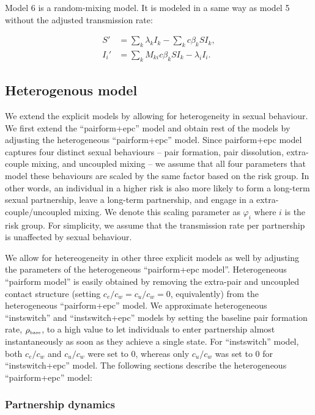\documentclass[10pt,letterpaper]{article}
\newcommand{\tsub}[2]{#1_{{\textrm{\tiny #2}}}}
\begin{document}
Model 6 is a random-mixing model. It is modeled in a same way as model 5 without the adjusted transmission rate:

\begin{equation}
\begin{aligned}
S' & = \sum_k \lambda_k I_k - \sum_k c \beta_k S I_k,\\
I_i' & = \sum_k M_{ki} c \beta_k S I_k - \lambda_i I_i.
\end{aligned}
\end{equation}

\subsection*{Heterogenous model}

We extend the explicit models by allowing for heterogeneity in sexual behaviour. We first extend the ``pairform+epc'' model and obtain rest of the models by adjusting the heterogeneous ``pairform+epc'' model. Since pairform+epc model captures four distinct sexual behaviours -- pair formation, pair dissolution, extra-couple mixing, and uncoupled mixing -- we assume that all four parameters that model these behaviours are scaled by the same factor based on the risk group. In other words, an individual in a higher risk is also more likely to form a long-term sexual partnership, leave a long-term partnership, and engage in a extra-couple/uncoupled mixing. We denote this scaling parameter as $\varphi_i$ where $i$ is the risk group. For simplicity, we assume that the transmission rate per partnership is unaffected by sexual behaviour. 

We allow for hetereogeneity in other three explicit models as well by adjusting the parameters of the heterogeneous ``pairform+epc model''. Heterogeneous ``pairform model'' is easily obtained by removing the extra-pair and uncoupled contact structure (setting $c_e/c_w = c_u/c_w = 0$, equivalently) from the heterogeneous ``pairform+epc'' model. We approximate heterogeneous ``instswitch'' and ``instswitch+epc'' models by setting the baseline pair formation rate, $\tsub{\rho}{base}$, to a high value to let individuals to enter partnership almost instantaneously as soon as they achieve a single state. For ``instswitch'' model, both $c_e/c_w$ and $c_u/c_w$ were set to 0, whereas only $c_u/c_w$ was set to 0 for ``instswitch+epc'' model. The following sections describe the heterogeneous ``pairform+epc'' model:

\subsubsection*{Partnership dynamics}
\end{document}

